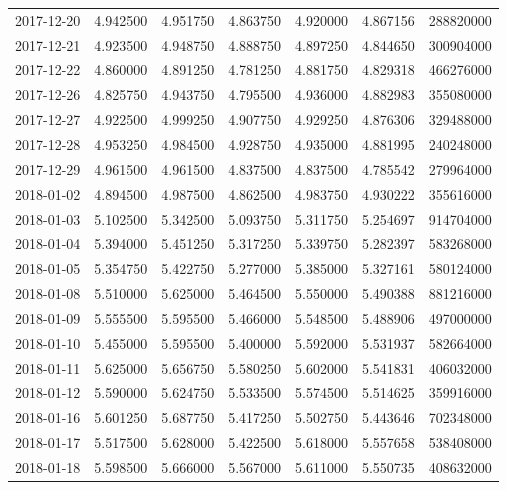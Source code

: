 \begin{tabular}{lrrrrrr}
2017-12-20 &    4.942500 &    4.951750 &    4.863750 &    4.920000 &    4.867156 &   288820000 \\
2017-12-21 &    4.923500 &    4.948750 &    4.888750 &    4.897250 &    4.844650 &   300904000 \\
2017-12-22 &    4.860000 &    4.891250 &    4.781250 &    4.881750 &    4.829318 &   466276000 \\
2017-12-26 &    4.825750 &    4.943750 &    4.795500 &    4.936000 &    4.882983 &   355080000 \\
2017-12-27 &    4.922500 &    4.999250 &    4.907750 &    4.929250 &    4.876306 &   329488000 \\
2017-12-28 &    4.953250 &    4.984500 &    4.928750 &    4.935000 &    4.881995 &   240248000 \\
2017-12-29 &    4.961500 &    4.961500 &    4.837500 &    4.837500 &    4.785542 &   279964000 \\
2018-01-02 &    4.894500 &    4.987500 &    4.862500 &    4.983750 &    4.930222 &   355616000 \\
2018-01-03 &    5.102500 &    5.342500 &    5.093750 &    5.311750 &    5.254697 &   914704000 \\
2018-01-04 &    5.394000 &    5.451250 &    5.317250 &    5.339750 &    5.282397 &   583268000 \\
2018-01-05 &    5.354750 &    5.422750 &    5.277000 &    5.385000 &    5.327161 &   580124000 \\
2018-01-08 &    5.510000 &    5.625000 &    5.464500 &    5.550000 &    5.490388 &   881216000 \\
2018-01-09 &    5.555500 &    5.595500 &    5.466000 &    5.548500 &    5.488906 &   497000000 \\
2018-01-10 &    5.455000 &    5.595500 &    5.400000 &    5.592000 &    5.531937 &   582664000 \\
2018-01-11 &    5.625000 &    5.656750 &    5.580250 &    5.602000 &    5.541831 &   406032000 \\
2018-01-12 &    5.590000 &    5.624750 &    5.533500 &    5.574500 &    5.514625 &   359916000 \\
2018-01-16 &    5.601250 &    5.687750 &    5.417250 &    5.502750 &    5.443646 &   702348000 \\
2018-01-17 &    5.517500 &    5.628000 &    5.422500 &    5.618000 &    5.557658 &   538408000 \\
2018-01-18 &    5.598500 &    5.666000 &    5.567000 &    5.611000 &    5.550735 &   408632000 \\

\end{tabular}
